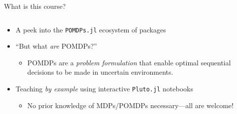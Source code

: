 \begin{frame}[fragile]{What is this course?}
\begin{columns}[T,onlytextwidth]
    \begin{column}{0.65\linewidth}
        {\footnotesize
        \begin{itemize}
            \item A peek into the \texttt{POMDPs.jl} ecosystem of \textbf{\large{\julialogo}} packages
            \item ``But what \textit{are} POMDPs?''
            \begin{itemize}
                \item POMDPs are a \textit{problem formulation} that enable optimal\footnotemark{} sequential decisions to be made in uncertain environments.
            \end{itemize}
            \item Teaching \textit{by example} using interactive \texttt{Pluto.jl} notebooks
            \begin{itemize}
                \item No prior knowledge of MDPs/POMDPs necessary---all are welcome!
            \end{itemize}
        \end{itemize}
        }
    \end{column}
\end{columns}
\end{frame}


